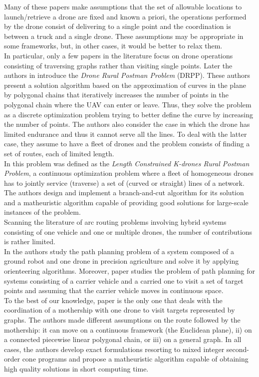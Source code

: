 \documentclass[10pt,a4paper]{elsarticle}
\newcommand{\EN}[1]{{\color{black}#1}}
\begin{document}
\noindent
Many of these papers make assumptions that the set of allowable locations to launch/retrieve a drone are fixed and known a priori, the operations performed by the drone consist of delivering to a single point and the coordination is between a truck and a single drone. These assumptions may be appropriate in some frameworks, but, in other cases, it \EN{would} be better to relax them.\\
\noindent
In particular, only a few papers in the literature focus on drone operations consisting of traversing graphs rather than visiting single points. Later \EN{the} authors in 
\cite{art:Campbell2018} introduce the \textit{Drone Rural Postman Problem} (DRPP). Th\EN{e}se authors present a solution algorithm based on the approximation of curves in the plane by polygonal chains that iteratively increases the number of points in the polygonal chain where the UAV can enter or leave. Thus, they solve the problem as a discrete optimization problem trying to better define the curve by increasing the number of points. The authors \EN{also} consider the case in which the drone has limited endurance and thus it cannot serve all the lines. To deal with th\EN{e} latter case, they assume to have a fleet of drones and the problem consists \EN{of} finding a set of routes, each of limited length.\\
In \cite{art:CAMPBELL202160}  this problem \EN{was} defined as the \textit{Length Constrained K-drones Rural Postman Problem}, a continuous optimization problem where a fleet of homogeneous drones ha\EN{s} to jointly service (traverse) a set of (curved or straight) lines of a network. The authors design and implement a branch-and-cut algorithm for its solution and a matheuristic algorithm capable of providing good solutions for large-scale instances of the problem.\\
Scanning the literature of arc routing problems involving hybrid systems consisting of one vehicle and one or multiple drones, the number of contributions is rather limited.\\
In \cite{art:Tokekar2016} the authors study the path planning problem of a system composed of a ground robot and one drone in precision agriculture and solve it by applying orienteering algorithms. Moreover, paper \cite{art:Garone2010} studies the problem of path planning for systems consisting of a carrier vehicle and a carried one to visit a set of target points and assuming that the carrier vehicle moves in continuous space.\\
To the best of our knowledge, paper \cite{art:Amorosi2021} is the only one that deals with the coordination of a mothership with one drone to visit targets represented by graphs. The authors made different assumptions on the route followed by the mothership: it can move on a continuous framework (the Euclidean plane), ii) on a connected piecewise linear polygonal chain, or iii) on a general graph. In all cases, the authors develop exact formulations resorting to mixed integer second-order cone programs and propose a matheuristic algorithm capable \EN{of obtaining} high quality solutions in short computing time.
\end{document}

